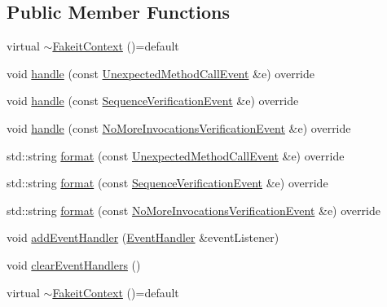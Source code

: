 \subsection*{Public Member Functions}
\begin{DoxyCompactItemize}
\item 
virtual \mbox{\hyperlink{structfakeit_1_1FakeitContext_adfad726870dfba97246a9ddfddd3a3d5}{$\sim$\+Fakeit\+Context}} ()=default
\item 
void \mbox{\hyperlink{structfakeit_1_1FakeitContext_ac39067234f37a88f6c19440df0bc1b32}{handle}} (const \mbox{\hyperlink{structfakeit_1_1UnexpectedMethodCallEvent}{Unexpected\+Method\+Call\+Event}} \&e) override
\item 
void \mbox{\hyperlink{structfakeit_1_1FakeitContext_a6b77f1360c9f8f4165e1152173789d6e}{handle}} (const \mbox{\hyperlink{structfakeit_1_1SequenceVerificationEvent}{Sequence\+Verification\+Event}} \&e) override
\item 
void \mbox{\hyperlink{structfakeit_1_1FakeitContext_a09e2d757900d3c49a1b17694fa0395f1}{handle}} (const \mbox{\hyperlink{structfakeit_1_1NoMoreInvocationsVerificationEvent}{No\+More\+Invocations\+Verification\+Event}} \&e) override
\item 
std\+::string \mbox{\hyperlink{structfakeit_1_1FakeitContext_a4da398d63e45c922606bbd5aaff30f6e}{format}} (const \mbox{\hyperlink{structfakeit_1_1UnexpectedMethodCallEvent}{Unexpected\+Method\+Call\+Event}} \&e) override
\item 
std\+::string \mbox{\hyperlink{structfakeit_1_1FakeitContext_af163c4c51929ef14c1c5529f2f42c40b}{format}} (const \mbox{\hyperlink{structfakeit_1_1SequenceVerificationEvent}{Sequence\+Verification\+Event}} \&e) override
\item 
std\+::string \mbox{\hyperlink{structfakeit_1_1FakeitContext_a49fae6e849a57fff6906a1a313fb4267}{format}} (const \mbox{\hyperlink{structfakeit_1_1NoMoreInvocationsVerificationEvent}{No\+More\+Invocations\+Verification\+Event}} \&e) override
\item 
void \mbox{\hyperlink{structfakeit_1_1FakeitContext_a176ad0df1fcb2758648f2c9b6c8fdd0d}{add\+Event\+Handler}} (\mbox{\hyperlink{structfakeit_1_1EventHandler}{Event\+Handler}} \&event\+Listener)
\item 
void \mbox{\hyperlink{structfakeit_1_1FakeitContext_a65960b8d910f35fa5c3f596f693e5c17}{clear\+Event\+Handlers}} ()
\item 
virtual \mbox{\hyperlink{structfakeit_1_1FakeitContext_adfad726870dfba97246a9ddfddd3a3d5}{$\sim$\+Fakeit\+Context}} ()=default

\end{DoxyCompactItemize}
